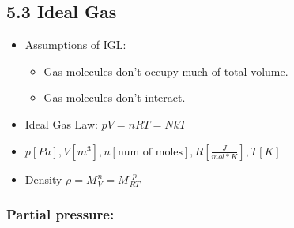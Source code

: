 \subsection{5.3 Ideal Gas}
    \begin{itemize}
        \itemsep0em
        \item Assumptions of IGL:
        \begin{itemize}
            \itemsep0em
            \item Gas molecules don't occupy much of total volume.
            \item Gas molecules don't interact.
        \end{itemize}
        \item Ideal Gas Law: $pV = nRT=N kT$
        \item $p\left[Pa\right], V\left[m^3\right], n\left[\text{num of moles}\right], R\left[\frac{J}{mol*K}\right], T\left[K\right]$
        \item Density $\rho = M\frac{n}{V}=M\frac{p}{RT}$
    \end{itemize}
    \subsubsection{Partial pressure:}
